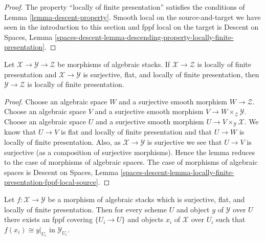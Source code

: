 \begin{proof}
The property
``locally of finite presentation''
satisfies the conditions of Lemma \ref{lemma-descent-property}.
Smooth local on the source-and-target we have seen in the
introduction to this section and fppf local on the target is
Descent on Spaces, Lemma
\ref{spaces-descent-lemma-descending-property-locally-finite-presentation}.
\end{proof}

\begin{lemma}
\label{lemma-flat-finite-presentation-permanence}
Let $\mathcal{X} \to \mathcal{Y} \to \mathcal{Z}$ be morphisms of
algebraic stacks. If $\mathcal{X} \to \mathcal{Z}$ is locally of finite
presentation and $\mathcal{X} \to \mathcal{Y}$ is surjective, flat, and
locally of finite presentation, then $\mathcal{Y} \to \mathcal{Z}$
is locally of finite presentation.
\end{lemma}

\begin{proof}
Choose an algebraic space $W$ and a surjective smooth morphism
$W \to \mathcal{Z}$. Choose an algebraic space $V$ and a surjective smooth
morphism $V \to W \times_\mathcal{Z} \mathcal{Y}$. Choose an algebraic space
$U$ and a surjective smooth morphism $U \to V \times_\mathcal{Y} \mathcal{X}$.
We know that $U \to V$ is flat and locally of finite presentation
and that $U \to W$ is locally of finite presentation.
Also, as $\mathcal{X} \to \mathcal{Y}$ is surjective we see that
$U \to V$ is surjective (as a composition of surjective morphisms).
Hence the lemma reduces to the case of morphisms of algebraic spaces.
The case of morphisms of algebraic spaces is
Descent on Spaces, Lemma
\ref{spaces-descent-lemma-locally-finite-presentation-fppf-local-source}.
\end{proof}

\begin{lemma}
\label{lemma-surjective-flat-locally-finite-presentation}
Let $f : \mathcal{X} \to \mathcal{Y}$ be a morphism of algebraic stacks
which is surjective, flat, and locally of finite presentation.
Then for every scheme $U$ and object $y$ of $\mathcal{Y}$ over $U$
there exists an fppf covering $\{U_i \to U\}$ and objects $x_i$
of $\mathcal{X}$ over $U_i$ such that $f(x_i) \cong y|_{U_i}$ in
$\mathcal{Y}_{U_i}$.
\end{lemma}

